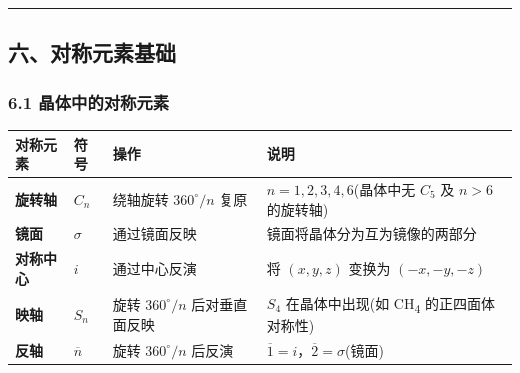 \begin{center}\rule{0.5\linewidth}{0.5pt}\end{center}

\subsection{六、对称元素基础}\label{ux516dux5bf9ux79f0ux5143ux7d20ux57faux7840}

\subsubsection{6.1 晶体中的对称元素}\label{ux6676ux4f53ux4e2dux7684ux5bf9ux79f0ux5143ux7d20}

{\def\LTcaptype{none} %
\begin{longtable}[]{@{}
  >{\centering\arraybackslash}p{}
  >{\centering\arraybackslash}p{}
  >{\raggedright\arraybackslash}p{}
  >{\raggedright\arraybackslash}p{}@{}}
\toprule\noalign{}
\begin{minipage}[b]{\linewidth}\centering
对称元素
\end{minipage} & \begin{minipage}[b]{\linewidth}\centering
符号
\end{minipage} & \begin{minipage}[b]{\linewidth}\raggedright
操作
\end{minipage} & \begin{minipage}[b]{\linewidth}\raggedright
说明
\end{minipage} \\
\midrule\noalign{}
\endhead
\bottomrule\noalign{}
\endlastfoot
\textbf{旋转轴} & \(C_n\) & 绕轴旋转 \(360^\circ/n\) 复原 & \(n = 1, 2, 3, 4, 6\)(晶体中无 \(C_5\) 及 \(n > 6\) 的旋转轴) \\
\textbf{镜面} & \(\sigma\) & 通过镜面反映 & 镜面将晶体分为互为镜像的两部分 \\
\textbf{对称中心} & \(i\) & 通过中心反演 & 将 \((x, y, z)\) 变换为 \((-x, -y, -z)\) \\
\textbf{映轴} & \(S_n\) & 旋转 \(360^\circ/n\) 后对垂直面反映 & \(S_4\) 在晶体中出现(如 CH\textsubscript{4} 的正四面体对称性) \\
\textbf{反轴} & \(\overline{n}\) & 旋转 \(360^\circ/n\) 后反演 & \(\overline{1} = i\)，\(\overline{2} = \sigma\)(镜面) \\
\end{longtable}
}

